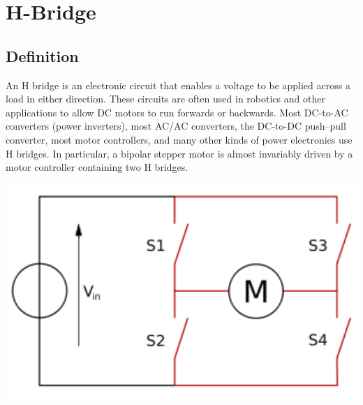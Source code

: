 \section{H-Bridge}

\subsection{Definition}
An H bridge is an electronic circuit that enables a voltage to be applied across a load in either direction. These circuits are often used in robotics and other applications to allow DC motors to run forwards or backwards.
Most DC-to-AC converters (power inverters), most AC/AC converters, the DC-to-DC push–pull converter, most motor controllers, and many other kinds of power electronics use H bridges. In particular, a bipolar stepper motor is almost invariably driven by a motor controller containing two H bridges.\\

\centerline{
	\centering
	\includegraphics[width=1.0\textwidth]{overview/images/H_bridge.png}
}

\newpage
